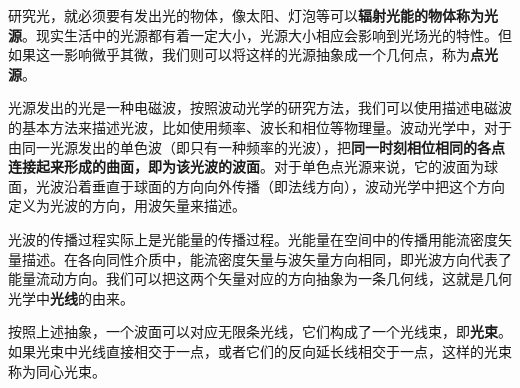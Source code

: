 
研究光，就必须要有发出光的物体，像太阳、灯泡等可以\textbf{辐射光能的物体称为光源}。现实生活中的光源都有着一定大小，光源大小相应会影响到光场光的特性。但如果这一影响微乎其微，我们则可以将这样的光源抽象成一个几何点，称为\textbf{点光源}。

光源发出的光是一种电磁波，按照波动光学的研究方法，我们可以使用描述电磁波的基本方法来描述光波，比如使用频率、波长和相位等物理量。波动光学中，对于由同一光源发出的单色波（即只有一种频率的光波），把\textbf{同一时刻相位相同的各点连接起来形成的曲面，即为该光波的波面}。对于单色点光源来说，它的波面为球面，光波沿着垂直于球面的方向向外传播（即法线方向），波动光学中把这个方向定义为光波的方向，用波矢量来描述。

光波的传播过程实际上是光能量的传播过程。光能量在空间中的传播用能流密度矢量描述。在各向同性介质中，能流密度矢量与波矢量方向相同，即光波方向代表了能量流动方向。我们可以把这两个矢量对应的方向抽象为一条几何线，这就是几何光学中\textbf{光线}的由来。

按照上述抽象，一个波面可以对应无限条光线，它们构成了一个光线束，即\textbf{光束}。如果光束中光线直接相交于一点，或者它们的反向延长线相交于一点，这样的光束称为同心光束。
